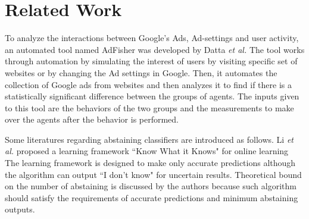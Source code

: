 \documentclass[12pt, journal]{IEEEtran}
\begin{document}
%



\section{Related Work}
To analyze the interactions between Google's Ads, Ad-settings and user activity, an automated tool named AdFisher \cite{datta} was developed by Datta \textit{et al.} The tool works through automation by simulating the interest of users by visiting specific set of websites or by changing the Ad settings in Google. Then, it automates the collection of Google ads from websites and then analyzes it to find if there is a statistically significant difference between the groups of agents. The inputs given to this tool are the behaviors of the two groups and the measurements to make over the agents after the behavior is performed.



Some literatures regarding abstaining classifiers are introduced as follows.
Li \textit{et al.} proposed a learning framework ``Know What it Knows" \cite{KWIK} for online learning
The learning framework is designed to make only accurate predictions although the algorithm can output ``I don't know" for uncertain results.
Theoretical bound on the number of abstaining is discussed by the authors because such algorithm should satisfy the requirements of accurate predictions and minimum abstaining outputs. 
\end{document}
